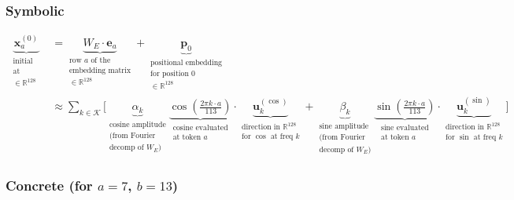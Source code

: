 \documentclass[11pt,a4paper]{article}
\begin{document}
\subsubsection*{Symbolic}
\begin{align}
    \underbrace{\mathbf{x}^{(0)}_a}_{\substack{\text{initial residual stream} \\ \text{at position 0} \\ \in \mathbb{R}^{128}}} &= \underbrace{W_E \cdot \mathbf{e}_a}_{\substack{\text{row } a \text{ of the} \\ \text{embedding matrix} \\ \in \mathbb{R}^{128}}} + \underbrace{\mathbf{p}_0}_{\substack{\text{positional embedding} \\ \text{for position 0} \\ \in \mathbb{R}^{128}}} \\
    &\approx \sum_{k \in \mathcal{K}} \bigg[ \underbrace{\alpha_k}_{\substack{\text{cosine amplitude} \\ \text{(from Fourier} \\ \text{decomp of } W_E\text{)}}} \underbrace{\cos\!\left(\frac{2\pi k \cdot a}{113}\right)}_{\substack{\text{cosine evaluated} \\ \text{at token } a}}\cdot \underbrace{\mathbf{u}_k^{(\cos)}}_{\substack{\text{direction in } \mathbb{R}^{128} \\ \text{for } \cos \text{ at freq } k}} + \underbrace{\beta_k}_{\substack{\text{sine amplitude} \\ \text{(from Fourier} \\ \text{decomp of } W_E\text{)}}} \underbrace{\sin\!\left(\frac{2\pi k \cdot a}{113}\right)}_{\substack{\text{sine evaluated} \\ \text{at token } a}}\cdot \underbrace{\mathbf{u}_k^{(\sin)}}_{\substack{\text{direction in } \mathbb{R}^{128} \\ \text{for } \sin \text{ at freq } k}} \bigg]
\end{align}

\subsubsection*{Concrete (for $a = 7$, $b = 13$)}
\end{document}
